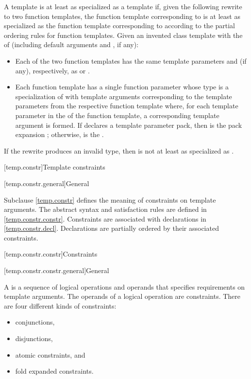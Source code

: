 \pnum
A template   is
at least as specialized as a template  
if, given the following rewrite to two function templates,
the function template corresponding to 
is at least as specialized as
the function template corresponding to 
according to the partial ordering rules
for function templates.
Given an invented class template 
with the  of  (including default arguments
and , if any):

\begin{itemize}
\item
Each of the two function templates has the same template parameters
and  (if any),
respectively, as  or .
\item
Each function template has a single function parameter
whose type is a specialization of 
with template arguments corresponding to the template parameters
from the respective function template where,
for each template parameter 
in the  of the function template,
a corresponding template argument  is formed.
If  declares a template parameter pack,
then  is the pack expansion ;
otherwise,  is the  .
\end{itemize}
If the rewrite produces an invalid type,
then  is not at least as specialized as .

[temp.constr]{Template constraints}

[temp.constr.general]{General}

\pnum
\begin{note}
Subclause \ref{temp.constr} defines the meaning of constraints on template arguments.
The abstract syntax and satisfaction rules are defined
in \ref{temp.constr.constr}.
Constraints are associated with declarations in \ref{temp.constr.decl}.
Declarations are partially ordered by their associated constraints.
\end{note}

[temp.constr.constr]{Constraints}

[temp.constr.constr.general]{General}

%

\pnum
A  is a sequence of logical operations and
operands that specifies requirements on template arguments.
The operands of a logical operation are constraints.
There are four different kinds of constraints:
\begin{itemize}
\item conjunctions,
\item disjunctions,
\item atomic constraints, and
\item fold expanded constraints.
\end{itemize}

